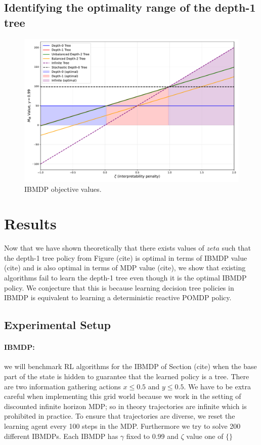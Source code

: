 \subsection{Identifying the optimality range of the depth-1 tree}
\begin{figure}
    \centering
    \includegraphics[width=1\textwidth]{images/images_part1/objective_values_plot.pdf}
    \caption{IBMDP objective values.}\label{fig:objectives}
\end{figure}
\section{Results}
Now that we have shown theoretically that there exists values of $zeta$ such that the depth-1 tree policy from Figure (cite) is optimal in terms of IBMDP value (cite) and is also optimal in terms of MDP value (cite),
we show that existing algorithms fail to learn the depth-1 tree even though it is the optimal IBMDP policy.
We conjecture that this is because learning decision tree policies in IBMDP is equivalent to learning a deterministic reactive POMDP policy.

\subsection{Experimental Setup}
\paragraph{IBMDP:} we will benchmark RL algorithms for the IBMDP of Section (cite) when the base part of the state is hidden to guarantee that the learned policy is a tree.
There are two information gathering actions $x\leq0.5$ and $y\leq0.5$.
We have to be extra careful when implementing this grid world because we work in the setting of discounted infinite horizon MDP; so in theory trajectories are infinite which is prohibited in practice.
To ensure that trajectories are diverse, we reset the learning agent every 100 steps in the MDP.
Furthermore we try to solve 200 different IBMDPs. Each IBMDP has $\gamma$ fixed to 0.99 and $\zeta$ value one of $\{\}$
